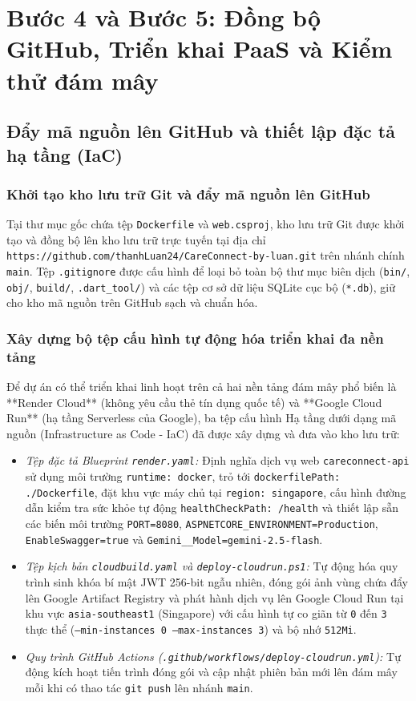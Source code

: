 \section{Bước 4 và Bước 5: Đồng bộ GitHub, Triển khai PaaS và Kiểm thử đám mây}

\subsection{Đẩy mã nguồn lên GitHub và thiết lập đặc tả hạ tầng (IaC)}

\subsubsection{Khởi tạo kho lưu trữ Git và đẩy mã nguồn lên GitHub}

Tại thư mục gốc chứa tệp \texttt{Dockerfile} và \texttt{web.csproj}, kho lưu trữ Git được khởi tạo và đồng bộ lên kho lưu trữ trực tuyến tại địa chỉ \texttt{https://github.com/thanhLuan24/CareConnect-by-luan.git} trên nhánh chính \texttt{main}. Tệp \texttt{.gitignore} được cấu hình để loại bỏ toàn bộ thư mục biên dịch (\texttt{bin/}, \texttt{obj/}, \texttt{build/}, \texttt{.dart\_tool/}) và các tệp cơ sở dữ liệu SQLite cục bộ (\texttt{*.db}), giữ cho kho mã nguồn trên GitHub sạch và chuẩn hóa.

\subsubsection{Xây dựng bộ tệp cấu hình tự động hóa triển khai đa nền tảng}

Để dự án có thể triển khai linh hoạt trên cả hai nền tảng đám mây phổ biến là **Render Cloud** (không yêu cầu thẻ tín dụng quốc tế) và **Google Cloud Run** (hạ tầng Serverless của Google), ba tệp cấu hình Hạ tầng dưới dạng mã nguồn (Infrastructure as Code - IaC) đã được xây dựng và đưa vào kho lưu trữ:
\begin{itemize}
    \item \textit{Tệp đặc tả Blueprint \texttt{render.yaml}:} Định nghĩa dịch vụ web \texttt{careconnect-api} sử dụng môi trường \texttt{runtime: docker}, trỏ tới \texttt{dockerfilePath: ./Dockerfile}, đặt khu vực máy chủ tại \texttt{region: singapore}, cấu hình đường dẫn kiểm tra sức khỏe tự động \texttt{healthCheckPath: /health} và thiết lập sẵn các biến môi trường \texttt{PORT=8080}, \texttt{ASPNETCORE\_ENVIRONMENT=Production}, \texttt{EnableSwagger=true} và \texttt{Gemini\_\_Model=gemini-2.5-flash}.
    \item \textit{Tệp kịch bản \texttt{cloudbuild.yaml} và \texttt{deploy-cloudrun.ps1}:} Tự động hóa quy trình sinh khóa bí mật JWT 256-bit ngẫu nhiên, đóng gói ảnh vùng chứa đẩy lên Google Artifact Registry và phát hành dịch vụ lên Google Cloud Run tại khu vực \texttt{asia-southeast1} (Singapore) với cấu hình tự co giãn từ \texttt{0} đến \texttt{3} thực thể (\texttt{--min-instances 0 --max-instances 3}) và bộ nhớ \texttt{512Mi}.
    \item \textit{Quy trình GitHub Actions (\texttt{.github/workflows/deploy-cloudrun.yml}):} Tự động kích hoạt tiến trình đóng gói và cập nhật phiên bản mới lên đám mây mỗi khi có thao tác \texttt{git push} lên nhánh \texttt{main}.
\end{itemize}

